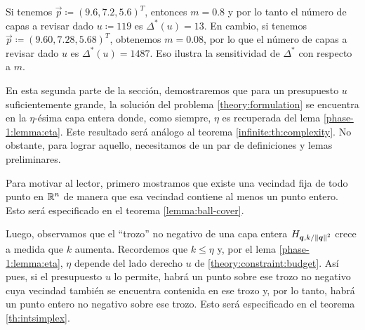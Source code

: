 \begin{example}
	\label{ex:decimals}
	Si tenemos $\vec{p} \coloneq (9.6, 7.2, 5.6)^T$, entonces $m = 0.8$ y por lo tanto el número de
	capas a revisar dado $u \coloneq 119$ es $\Delta^*(u) = 13$. En cambio, si tenemos $\vec{p} \coloneq
	(9.60, 7.28, 5.68)^T$, obtenemos $m = 0.08$, por lo que el número de capas a revisar dado $u$ es
	$\Delta^*(u) = 1487$. Eso ilustra la sensitividad de $\Delta^*$ con respecto a $m$.
\end{example}

% 
% 


En esta segunda parte de la sección, demostraremos que para un presupuesto $u$ suficientemente
grande, la solución del problema \eqref{theory:formulation} se encuentra en la $\eta$-ésima capa
entera donde, como siempre, $\eta$ es recuperada del lema \ref{phase-1:lemma:eta}. Este resultado
será análogo al teorema \ref{infinite:th:complexity}. No obstante, para lograr aquello, necesitamos
de un par de definiciones y lemas preliminares.

Para motivar al lector, primero mostramos que existe una vecindad fija de todo punto en $\mathbb{R}^n$ de
manera que esa vecindad contiene al menos un punto entero. Esto será especificado en el teorema
\ref{lemma:ball-cover}.

Luego, observamos que el ``trozo'' no negativo de una capa entera $H_{\boldsymbol{\boldsymbol{q}}, k/\left\lVert \boldsymbol{\boldsymbol{q}} \right\rVert^{2}}$ crece a medida que $k$ aumenta. Recordemos que $k \leq
\eta$ y, por el lema \ref{phase-1:lemma:eta}, $\eta$ depende del lado derecho
$u$ de \eqref{theory:constraint:budget}. Así pues, si el presupuesto $u$ lo
permite, habrá un punto sobre ese trozo no negativo cuya vecindad también se
encuentra contenida en ese trozo y, por lo tanto, habrá un punto entero no
negativo sobre ese trozo. Esto será especificado en el teorema
\ref{th:intsimplex}.

